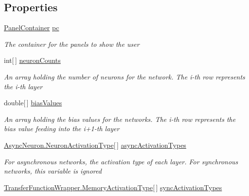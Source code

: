 \subsection*{Properties}
\begin{DoxyCompactItemize}
\item 
\hyperlink{class_n_n_gen_1_1_panel_container}{Panel\+Container} \hyperlink{class_n_n_gen_1_1_wizard_controller_a9954efe53bf629492e68dd6692092a94}{pc}
\begin{DoxyCompactList}\small\item\em The container for the panels to show the user \end{DoxyCompactList}\item 
int\mbox{[}$\,$\mbox{]} \hyperlink{class_n_n_gen_1_1_wizard_controller_ad5eb425198c744f28f5e228eeffc895b}{neuron\+Counts}
\begin{DoxyCompactList}\small\item\em An array holding the number of neurons for the network. The i-\/th row represents the i-\/th layer \end{DoxyCompactList}\item 
double\mbox{[}$\,$\mbox{]} \hyperlink{class_n_n_gen_1_1_wizard_controller_a0575bbc3820b30e2890579150cb924f0}{bias\+Values}
\begin{DoxyCompactList}\small\item\em An array holding the bias values for the networks. The i-\/th row represents the bias value feeding into the i+1-\/th layer \end{DoxyCompactList}\item 
\hyperlink{class_n_n_gen_1_1_async_neuron_afe8460a52808d1587cbcc0a8e4e23b64}{Async\+Neuron.\+Neuron\+Activation\+Type}\mbox{[}$\,$\mbox{]} \hyperlink{class_n_n_gen_1_1_wizard_controller_acbc7dd16f2727da7272632e3737989d6}{async\+Activation\+Types}
\begin{DoxyCompactList}\small\item\em For asynchronous networks, the activation type of each layer. For synchronous networks, this variable is ignored \end{DoxyCompactList}\item 
\hyperlink{class_n_n_gen_1_1_transfer_function_wrapper_aa338ffadb8fcdf76df75419374a51ff6}{Transfer\+Function\+Wrapper.\+Memory\+Activation\+Type}\mbox{[}$\,$\mbox{]} \hyperlink{class_n_n_gen_1_1_wizard_controller_ad211fa93c8e54fb2f0383889bcb28964}{sync\+Activation\+Types}

\end{DoxyCompactItemize}
